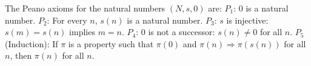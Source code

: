 The Peano axioms for the natural numbers $(N, s, 0)$ are:
$P_1$: $0$ is a natural number.
$P_2$: For every $n$, $s(n)$ is a natural number.
$P_3$: $s$ is injective: $s(m) = s(n)$ implies $m = n$.
$P_4$: $0$ is not a successor: $s(n) \neq 0$ for all $n$.
$P_5$ (Induction): If $\pi$ is a property such that $\pi(0)$ and $\pi(n) \Rightarrow \pi(s(n))$ for all $n$, then $\pi(n)$ for all $n$.
